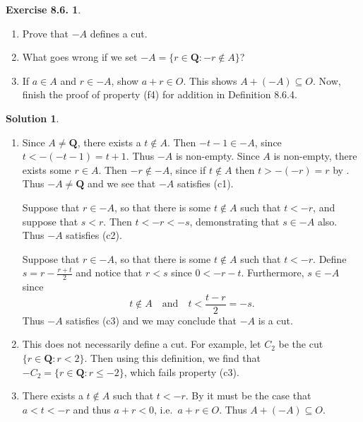 \documentclass[12pt]{article}
\theoremstyle{definition}
\theoremstyle{exercise}
\newtheorem{exercise}{Exercise 8.6.}
\theoremstyle{solution}
\newtheorem*{solution}{Solution}
\newcommand{\quand}{\quad \text{and} \quad}
\newcommand{\Q}{\mathbf{Q}}
\begin{document}
\begin{exercise}
\label{ex:6}
    \begin{enumerate}
        \item Prove that \( -A \) defines a cut.

        \item What goes wrong if we set \( -A = \{ r \in \Q : -r \not\in A \} \)?

        \item If \( a \in A \) and \( r \in -A \), show \( a + r \in O \). This shows \( A + (-A) \subseteq O \). Now, finish the proof of property (f4) for addition in Definition 8.6.4.
    \end{enumerate}
\end{exercise}

\begin{solution}
    \begin{enumerate}
        \item Since \( A \neq \Q \), there exists a \( t \not\in A \). Then \( -t - 1 \in -A \), since \( t < -(-t - 1) = t + 1 \). Thus \( -A \) is non-empty. Since \( A \) is non-empty, there exists some \( r \in A \). Then \( -r \not\in -A \), since if \( t \not\in A \) then \( t > -(-r) = r \) by . Thus \( -A \neq \Q \) and we see that \( -A \) satisfies (c1).

        Suppose that \( r \in -A \), so that there is some \( t \not\in A \) such that \( t < -r \), and suppose that \( s < r \). Then \( t < -r < -s \), demonstrating that \( s \in -A \) also. Thus \( -A \) satisfies (c2).

        Suppose that \( r \in -A \), so that there is some \( t \not\in A \) such that \( t < -r \). Define \( s = r - \tfrac{r + t}{2} \) and notice that \( r < s \) since \( 0 < -r - t \). Furthermore, \( s \in -A \) since
        \[
            t \not\in A \quand t < \frac{t - r}{2} = -s.
        \]
        Thus \( -A \) satisfies (c3) and we may conclude that \( -A \) is a cut.

        \item This does not necessarily define a cut. For example, let \( C_2 \) be the cut \( \{ r \in \Q : r < 2 \} \). Then using this definition, we find that \( -C_2 = \{ r \in \Q : r \leq -2 \} \), which fails property (c3).

        \item There exists a \( t \not\in A \) such that \( t < -r \). By  it must be the case that \( a < t < -r \) and thus \( a + r < 0 \), i.e.\ \( a + r \in O \). Thus \( A + (-A) \subseteq O \).
        

\end{enumerate}
\end{solution}
\end{document}
